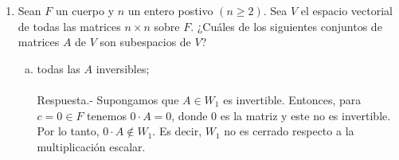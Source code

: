 \begin{enumerate}[\bfseries 1.]
$$\begin{array}{rcl}
\begin{array}{rrrrr}
		    0 & -1 & 0 & -1 & 2\\
		    0 & -3 & 0 & -3 & 6
		\end{array}
	    \right]\\\\
	    &-R_2\to R_2&
	    \left[
		\begin{array}{rrrrr}
		    1 & 0 & 2/3 & 0 & -1\\
		    0 & 1 & 0 & 1 & -2\\
		    0 & -3 & 0 & -3 & 6
		\end{array}
	    \right]\\\\
	    &R_3+3R_2\to R_3&
	    \left[
		\begin{array}{rrrrr}
		    1 & 0 & 2/3 & 0 & -1\\
		    0 & 1 & 0 & 1 & -2\\
		    0 & 0 & 0 & 0 & 0 
		\end{array}
	    \right]

	\end{array}
	$$

	Por lo tanto, 

	$$
	\begin{array}{rcl}
	    x_1 &=& x_5-\frac{2}{3}x_3\\\\
	    x_2&=& x_4 + 2x_5.
	\end{array}
	$$

	Así, el conjunto que genera $W$ estará dada por la forma:

	$$W=\left\{\left(x_5-\dfrac{2}{3}x_3,x_4+2x_5,x_3,x_4,x_5\right)\in R^5\right\}$$

	De lo que, un conjunto generado para $W$ viene dado por los vectores:

	$$(-2,0,3,0,0),\quad (0,-1,0,1,0)\quad y \quad (1,2,0,0,1).$$\\

    \item Sean $F$ un cuerpo y $n$ un entero postivo $(n\geq 2)$. Sea $V$ el espacio vectorial de todas las matrices $n\times n$ sobre $F$. ¿Cuáles de los siguientes conjuntos de matrices $A$ de $V$ son subespacios de $V$?\\

	\begin{enumerate}[(a)]

	    \item todas las $A$ inversibles;\\\\
		Respuesta.-\; Supongamos que $A\in W_1$ es invertible. Entonces, para $c=0\in F$ tenemos $0\cdot A = 0$, donde $0$ es la matriz y este no es invertible. Por lo tanto, $0\cdot A \notin W_1$. Es decir, $W_1$ no es cerrado respecto a la multiplicación escalar.\\\\


\end{enumerate}
\end{enumerate}
